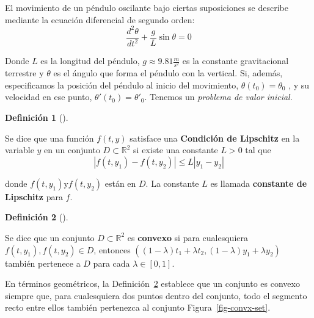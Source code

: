 \documentclass[
  spanish,
  us-letterpaper,
  DIV=11,
  numbers=noendperiod]{scrreprt}
\theoremstyle{definition}
\newtheorem{definition}{Definición}[chapter]
\theoremstyle{plain}
\theoremstyle{remark}
\begin{document}
\begin{tcolorbox}[enhanced jigsaw, title={Ejemplo}, left=2mm, toprule=.15mm, bottomrule=.15mm, breakable, coltitle=black, leftrule=.75mm, toptitle=1mm, colbacktitle=quarto-callout-caution-color!10!white, opacityback=0, rightrule=.15mm, colback=white, titlerule=0mm, arc=.35mm, opacitybacktitle=0.6, bottomtitle=1mm, colframe=quarto-callout-caution-color-frame]

El movimiento de un péndulo oscilante bajo ciertas suposiciones se
describe mediante la ecuación diferencial de segundo orden: \[
\dfrac{d^2 \theta}{d t^2} + \dfrac{g}{L} \sin{\theta} = 0 
\]

Donde \(L\) es la longitud del péndulo, \(g \approx 9.81 \frac{m}{s^2}\)
es la constante gravitacional terrestre y \(\theta\) es el ángulo que
forma el péndulo con la vertical. Si, además, especificamos la posición
del péndulo al inicio del movimiento, \(\theta(t_0) = \theta_{0}\) , y
su velocidad en ese punto, \(\theta'(t_0) = \theta'_0\). Tenemos un
\emph{problema de valor inicial}.

\end{tcolorbox}

\begin{definition}[]\protect\hypertarget{def-Lip-con}{}\label{def-Lip-con}

Se dice que una función \(f(t,y)\) satisface una \textbf{Condición de
Lipschitz} en la variable \(y\) en un conjunto
\(D \subset \mathbb{R}^2\) si existe una constante \(L>0\) tal que \[
|f(t,y_1) - f(t,y_2)| \leq L|y_1-y_2|
\]

donde \(f(t,y_1) \text{y} f(t,y_2)\) están en \(D\). La constante \(L\)
es llamada \textbf{constante de Lipschitz} para \(f\).

\end{definition}

\begin{definition}[]\protect\hypertarget{def-convex-set}{}\label{def-convex-set}

Se dice que un conjunto \(D \subset \mathbb{R}^2\) es \textbf{convexo}
si para cualesquiera \(f(t,y_1), f(t,y_2) \in D\), entonces
\(((1-\lambda)t_1 + \lambda t_2, (1-\lambda)y_1 + \lambda y_2)\) también
pertenece a \(D\) para cada \(\lambda \in[0,1]\).

\end{definition}

En términos geométricos, la Definición~\ref{def-convex-set} establece
que un conjunto es convexo siempre que, para cualesquiera dos puntos
dentro del conjunto, todo el segmento recto entre ellos también
pertenezca al conjunto Figura~\ref{fig-convx-set}.
\end{document}
